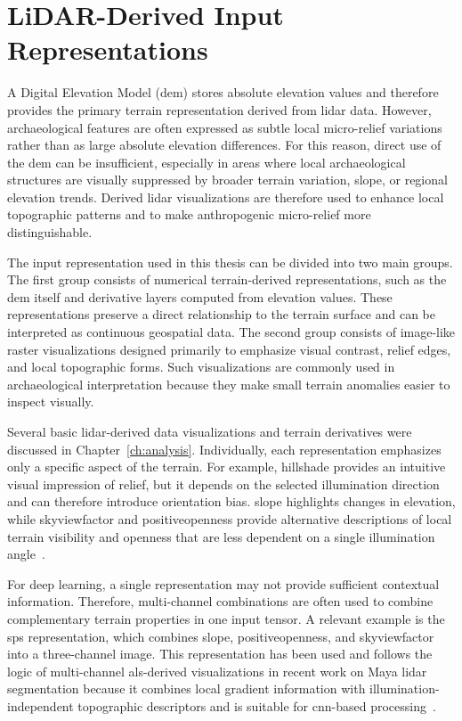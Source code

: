 \section{LiDAR-Derived Input Representations}\label{sec:lidar_input_representations}

A Digital Elevation Model (\gls{dem}) stores absolute elevation values and therefore provides the primary terrain representation derived from \gls{lidar} data. However, archaeological features are often expressed as subtle local micro-relief variations rather than as large absolute elevation differences. For this reason, direct use of the \gls{dem} can be insufficient, especially in areas where local archaeological structures are visually suppressed by broader terrain variation, \gls{slope}, or regional elevation trends. Derived \gls{lidar} visualizations are therefore used to enhance local topographic patterns and to make anthropogenic micro-relief more distinguishable.

The input representation used in this thesis can be divided into two main groups. The first group consists of numerical terrain-derived representations, such as the \gls{dem} itself and derivative layers computed from elevation values. These representations preserve a direct relationship to the terrain surface and can be interpreted as continuous geospatial data. The second group consists of image-like raster visualizations designed primarily to emphasize visual contrast, relief edges, and local topographic forms. Such visualizations are commonly used in archaeological interpretation because they make small terrain anomalies easier to inspect visually.

Several basic \gls{lidar}-derived data visualizations and terrain derivatives were discussed in Chapter~\ref{ch:analysis}. Individually, each representation emphasizes only a specific aspect of the terrain. For example, \gls{hillshade} provides an intuitive visual impression of relief, but it depends on the selected illumination direction and can therefore introduce orientation bias. \gls{slope} highlights changes in elevation, while \gls{skyviewfactor} and \gls{positiveopenness} provide alternative descriptions of local terrain visibility and openness that are less dependent on a single illumination angle~\cite{thompson_detecting_2020,kokalj_standardizing_2025}.

For deep learning, a single representation may not provide sufficient contextual information. Therefore, multi-channel combinations are often used to combine complementary terrain properties in one input tensor. A relevant example is the \gls{sps} representation, which combines \gls{slope}, \gls{positiveopenness}, and \gls{skyviewfactor} into a three-channel image. This representation has been used and follows the logic of multi-channel \gls{als}-derived visualizations in recent work on Maya \gls{lidar} segmentation because it combines local gradient information with illumination-independent topographic descriptors and is suitable for \gls{cnn}-based processing~\cite{somrak_learning_2020,zhang_unveiling_2024}.

